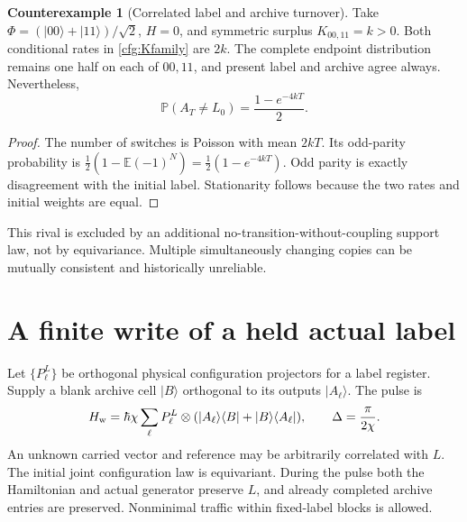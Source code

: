 \documentclass[11pt,oneside,openany]{book}
\theoremstyle{definition}
\newtheorem{counterexample}[theorem]{Counterexample}
\theoremstyle{remark}\newtheorem{remark}[theorem]{Remark}
\begin{document}
\begin{counterexample}[Correlated label and archive turnover]
\label{cfg:turnover}
Take $\Phi=(|00\rangle+|11\rangle)/\sqrt2$, $H=0$, and symmetric
surplus $K_{00,11}=k>0$. Both conditional rates in
\eqref{cfg:Kfamily} are $2k$. The complete endpoint distribution remains
one half on each of $00,11$, and present label and archive agree always.
Nevertheless,
\begin{equation}
 \mathbb P(A_T\ne L_0)=\frac{1-e^{-4kT}}2.
 \label{cfg:turnovererror}
\end{equation}
\end{counterexample}
\begin{proof}
The number of switches is Poisson with mean $2kT$. Its odd-parity
probability is
$\frac12(1-\mathbb E(-1)^N)=\frac12(1-e^{-4kT})$.
Odd parity is exactly disagreement with the initial label. Stationarity
follows because the two rates and initial weights are equal.
\end{proof}
This rival is excluded by an additional no-transition-without-coupling
support law, not by equivariance. Multiple simultaneously changing copies
can be mutually consistent and historically unreliable.

\section{A finite write of a held actual label}

Let $\{P_\ell^L\}$ be orthogonal physical configuration projectors for a
label register. Supply a blank archive cell $|B\rangle$ orthogonal to
its outputs $|A_\ell\rangle$. The pulse is
\begin{equation}
 H_{\rm w}=\hbar\chi\sum_\ell P_\ell^L\otimes
      (|A_\ell\rangle\langle B|+|B\rangle\langle A_\ell|),
 \qquad \Delta=\frac{\pi}{2\chi}.
 \label{cfg:heldwriteH}
\end{equation}
An unknown carried vector and reference may be arbitrarily correlated with
$L$. The initial joint configuration law is equivariant. During the pulse
both the Hamiltonian and actual generator preserve $L$, and already completed
archive entries are preserved. Nonminimal traffic within fixed-label blocks
is allowed.
\end{document}
